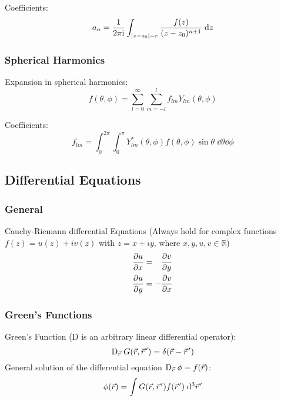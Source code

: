 			\noindent
			Coefficients:
			\begin{equation}
				a_n = \frac{1}{2 \pi \mathrm{i}}\int_{\abs{ z-z_0 } = r} \frac{f(z)}{(z-z_0)^{n+1}}\;\dd z
			\end{equation}

		\subsubsection{Spherical Harmonics}
			\noindent
			Expansion in spherical harmonics:
			\begin{equation}
				f(\theta, \phi) = \sum_{l=0}^{\infty} \sum_{m=-l}^{l} f_{lm} Y_{lm}(\theta,\phi)
			\end{equation}

			\noindent
			Coefficients:
			\begin{equation}
				f_{lm} = \int_0^{2\pi} \int_0^\pi Y_{lm}^{*}(\theta,\phi) f(\theta,\phi) \sin\theta\;\dd\theta\dd\phi
			\end{equation}

	\subsection{Differential Equations}
		\subsubsection{General}
			\noindent
			Cauchy-Riemann differential Equations (Always hold for complex functions $f(z)=u(z)+iv(z)$ with $z=x+iy$, where $x,y,u,v\in\mathbb{R}$)
			\begin{equation}
				\begin{aligned}
					\pdv{u}{x} &= \phantom{-}\pdv{v}{y} \\
					\pdv{u}{y} &= -\pdv{v}{x} \\
				\end{aligned}
			\end{equation}


		\subsubsection{Green's Functions}
			\noindent
			Green's Function ($\mathrm{D}$ is an arbitrary linear differential operator):
			\begin{equation}
				\mathrm{D}_{\pvec{r}}\, G\qty(\vec{r},\pvec{r}') = \delta\qty(\vec{r} - \pvec{r}')
			\end{equation}
			General solution of the differential equation $\mathrm{D}_{\pvec{r}}\, \phi = f\qty(\vec{r})$:
			\begin{equation}
				\phi\qty(\vec{r}) = \int G\qty(\vec{r},\pvec{r}')f\qty(\pvec{r}')\;\dd^3\pvec{r}'
			\end{equation}

